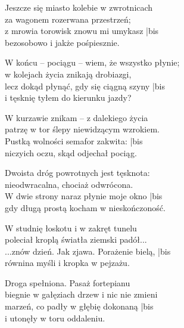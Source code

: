 \begin{text}
    \hfill\break
    Jeszcze się miasto kolebie w zwrotnicach\\
    za wagonem rozerwana przestrzeń;\\
    z mrowia torowisk znowu mi umykasz |bis\\
    bezosobowo i jakże pośpiesznie.

    W końcu – pociągu – wiem, że wszystko płynie;\\
    w kolejach życia znikają drobiazgi,\\
    lecz dokąd płynąć, gdy się ciągną szyny |bis\\
    i tęsknię tyłem do kierunku jazdy?

    W kurzawie znikam – z dalekiego życia\\
    patrzę w tor ślepy niewidzącym wzrokiem.\\
    Pustką wolności semafor zakwita: |bis\\
    niczyich oczu, skąd odjechał pociąg.

    Dwoista dróg powrotnych jest tęsknota:\\
    nieodwracalna, chociaż odwrócona.\\
    W dwie strony naraz płynie moje okno |bis\\
    gdy długą prostą kocham w nieskończoność.

    \hfill\break
    W studnię łoskotu i w zakręt tunelu\\
    poleciał kroplą światła ziemski padół...\\
    ...znów dzień. Jak zjawa. Porażenie bielą, |bis\\
    równina myśli i kropka w pejzażu.

    Droga spełniona. Pasaż fortepianu\\
    biegnie w gałęziach drzew i nic nie zmieni\\
    marzeń, co padły w głębię dokonaną |bis\\
    i utonęły w toru oddaleniu.
\end{text}
